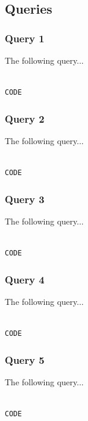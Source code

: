 \documentclass{article}
\begin{document}
\subsection{Queries}
\subsubsection{Query 1}
The following query...

\begin{lstlisting}[language=cypher, label=lst:cypher-example]

CODE

\end{lstlisting}
\subsubsection{Query 2}
The following query...

\begin{lstlisting}[language=cypher, label=lst:cypher-example]

CODE

\end{lstlisting}
\subsubsection{Query 3}
The following query...

\begin{lstlisting}[language=cypher, label=lst:cypher-example]

CODE

\end{lstlisting}
\subsubsection{Query 4}
The following query...

\begin{lstlisting}[language=cypher, label=lst:cypher-example]

CODE

\end{lstlisting}
\subsubsection{Query 5}
The following query...

\begin{lstlisting}[language=cypher, label=lst:cypher-example]

CODE

\end{lstlisting}
\end{document}
